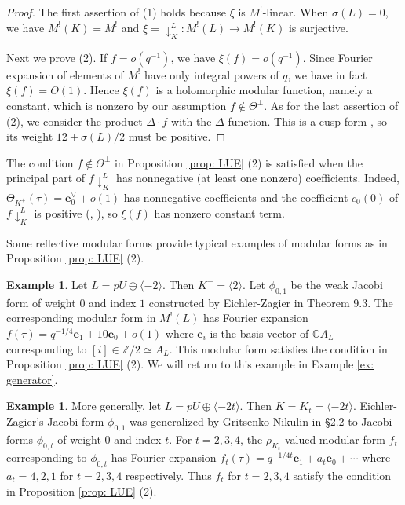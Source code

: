 \documentclass[12pt]{amsart}
\numberwithin{equation}{section}
\theoremstyle{definition}
\newtheorem{example}[theorem]{Example}
\theoremstyle{remark}
\newcommand{\Z}{\mathbb{Z}}
\newcommand{\C}{\mathbb{C}}
\newcommand{\pushLK}{\downarrow^{L}_{K}}
\newcommand{\ML}{M^{!}(L)}
\begin{document}
\begin{proof}
The first assertion of (1) holds because $\xi$ is $M^!$-linear. 
When $\sigma(L)=0$, 
we have $M^!(K)=M^!$ and 
$\xi={\pushLK}\colon {\ML}\to M^{!}(K)$ is surjective. 

Next we prove (2). 
If $f=o(q^{-1})$, we have 
$\xi(f) = o(q^{-1})$. 
Since Fourier expansion of elements of $M^!$ have only integral powers of $q$, 
we have in fact $\xi(f) = O(1)$. 
Hence $\xi(f)$ is a holomorphic modular function, 
namely a constant, 
which is nonzero by our assumption $f\not\in \Theta^{\perp}$. 
As for the last assertion of (2), 
we consider the product $\Delta\cdot f$ with the $\Delta$-function. 
This is a cusp form , so its weight $12+\sigma(L)/2$ must be positive. 
\end{proof}


The condition $f\not\in \Theta^{\perp}$ in Proposition \ref{prop: LUE} (2) is satisfied when 
the principal part of $f{\pushLK}$ has nonnegative (at least one nonzero) coefficients. 
Indeed, $\Theta_{K^{+}}(\tau)=\mathbf{e}_{0}^{\vee}+o(1)$ has nonnegative coefficients 
and the coefficient $c_{0}(0)$ of $f{\pushLK}$ is positive (\cite{Br}, \cite{B-K}), 
so $\xi(f)$ has nonzero constant term. 

Some reflective modular forms provide 
typical examples of modular forms as in Proposition \ref{prop: LUE} (2). 

\begin{example}\label{ex: reflective 1}
Let $L= pU \oplus \langle -2 \rangle$. 
Then $K^{+}= \langle 2 \rangle$. 
Let $\phi_{0,1}$ be the weak Jacobi form of weight $0$ and index $1$ 
constructed by Eichler-Zagier in \cite{E-Z} Theorem 9.3. 
The corresponding modular form in ${\ML}$ has Fourier expansion 
$f(\tau)=q^{-1/4}\mathbf{e}_{1}+10\mathbf{e}_{0}+o(1)$  
where $\mathbf{e}_{i}$ is the basis vector of ${\C}A_{L}$ corresponding to $[i]\in {\Z}/2\simeq A_{L}$. 
This modular form satisfies the condition in Proposition \ref{prop: LUE} (2). 
We will return to this example in Example \ref{ex: generator}. 
\end{example}


\begin{example}\label{ex: reflective 2}
More generally, let $L=pU\oplus \langle -2t \rangle$. 
Then $K=K_{t}=\langle -2t \rangle$. 
Eichler-Zagier's Jacobi form $\phi_{0,1}$ was generalized by Gritsenko-Nikulin in \cite{G-N} \S 2.2 
to Jacobi forms $\phi_{0,t}$ of weight $0$ and index $t$. 
For $t=2, 3, 4$, 
the $\rho_{K_{t}}$-valued modular form $f_{t}$ corresponding to $\phi_{0,t}$ 
has Fourier expansion 
$f_{t}(\tau) = q^{-1/4t}\mathbf{e}_{1}+a_{t}\mathbf{e}_{0}+ \cdots $ 
where 
$a_{t}=4, 2, 1$ for $t=2, 3, 4$ respectively. 
Thus $f_{t}$ for $t=2, 3, 4$ satisfy the condition in Proposition \ref{prop: LUE} (2). 
\end{example}
\end{document}
